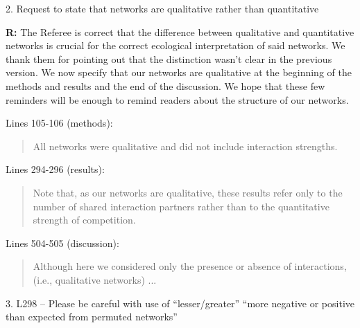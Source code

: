 \documentclass[12pt]{letter}
\begin{document}


	2. Request to state that networks are qualitative rather than quantitative 

		\textbf{R:} The Referee is correct that the difference between qualitative and quantitative networks is crucial for the correct ecological interpretation of said networks. We thank them for pointing out that the distinction wasn't clear in the previous version. We now specify that our networks are qualitative at the beginning of the methods and results and the end of the discussion. We hope that these few reminders will be enough to remind readers about the structure of our networks.

		Lines 105-106 (methods):

		\begin{quotation}

			All networks were qualitative and did not include interaction strengths.

		\end{quotation}


		Lines 294-296 (results):
		
		\begin{quotation}

			Note that, as our networks 
		    are qualitative, these results refer only to the number of shared interaction
	    	partners rather than to the quantitative strength of competition.

    	\end{quotation}


    	Lines 504-505 (discussion):

    	\begin{quotation}

		  Although here we considered only the presence or absence of interactions,
		  (i.e., qualitative networks) ...

    	\end{quotation}


	3. L298 – Please be careful with use of “lesser/greater” “more negative or positive than expected from permuted networks” 
\end{document}

